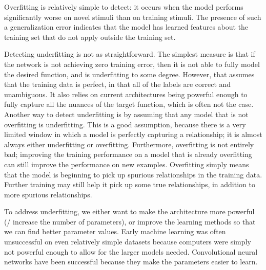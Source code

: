 Overfitting is relatively simple to detect:
it occurs when the model performs significantly worse
on novel stimuli than on training stimuli.
The presence of such a generalization error
indicates that the model has learned features about the training set
that do not apply outside the training set.

Detecting underfitting is not as straightforward.
The simplest measure is that if the network is not achieving zero training error,
then it is not able to fully model the desired function,
and is underfitting to some degree.
However, that assumes that the training data is perfect,
in that all of the labels are correct and unambiguous.
It also relies on current architectures being powerful enough
to fully capture all the nuances of the target function,
which is often not the case.
Another way to detect underfitting is by assuming that
any model that is not overfitting is underfitting.
This is a good assumption,
because there is a very limited window in which a model is
perfectly capturing a relationship;
it is almost always either underfitting or overfitting.
Furthermore, overfitting is not entirely bad;
improving the training performance on a model that is already overfitting
can still improve the performance on new examples.
Overfitting simply means that the model is beginning to pick up
spurious relationships in the training data.
Further training may still help it pick up some true relationships,
in addition to more spurious relationships.

To address underfitting,
we either want to make the architecture more powerful
(\eg/ increase the number of parameters),
or improve the learning methods so that we can find better parameter values.
Early machine learning was often unsuccessful on even relatively simple datasets
because computers were simply not powerful enough to allow for
the larger models needed.
Convolutional neural networks have been successful
because they make the parameters easier to learn.

